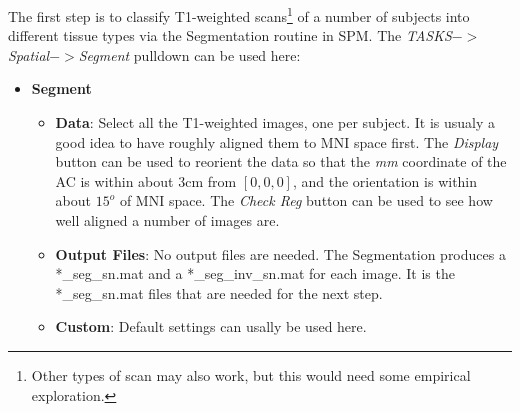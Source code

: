 The first step is to classify T1-weighted scans\footnote{Other types of scan may also work, but this would need some empirical exploration.} of a number of subjects into different tissue types via the Segmentation routine in SPM.
The \emph{TASKS$->$Spatial$->$Segment} pulldown can be used here:
\begin{itemize}
\item{{\bf Segment}
  \begin{itemize}
  \item{{\bf Data}: Select all the T1-weighted images, one per subject.  It is usualy a good idea to have roughly aligned them to MNI space first.  The \emph{Display} button can be used to reorient the data so that the \emph{mm} coordinate of the AC is within about 3cm from $[0, 0, 0]$, and the orientation is within about $15^o$ of MNI space.  The \emph{Check Reg} button can be used to see how well aligned a number of images are.
  }
  \item{{\bf Output Files}: No output files are needed.  The Segmentation produces a *\_seg\_sn.mat and a *\_seg\_inv\_sn.mat for each image.  It is the *\_seg\_sn.mat files that are needed for the next step.
  }
  \item{{\bf Custom}: Default settings can usally be used here.
  }
  \end{itemize}
}
\end{itemize}

